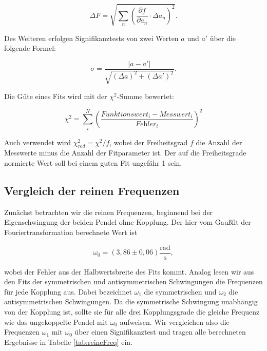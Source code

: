 \documentclass{article}
\begin{document}
\begin{equation}
    \Delta F = \sqrt{\sum_n \left( \frac{\partial f}{\partial a_n} \cdot \Delta a_n \right)^2}.
\end{equation}

Des Weiteren erfolgen Signifikanztests von zwei Werten $a$ und $a'$ über die folgende Formel:

\begin{equation}
    \sigma = \frac{|a-a'|}{\sqrt{(\Delta a)^2 + (\Delta a')^2}}.
\end{equation}

Die Güte eines Fits wird mit der $\chi^2$-Summe bewertet:

\begin{equation}
    \chi^2 = \sum_i^N \left( \frac{\textit{Funktionswert}_i - \textit{Messwert}_i}{\textit{Fehler}_i} \right)^2
\end{equation}

Auch verwendet wird $\chi^2_{red} = \chi^2 / f$, wobei der Freiheitsgrad $f$ die Anzahl der Messwerte minus die Anzahl der Fitparameter ist. Der auf die Freiheitsgrade normierte Wert soll bei einem guten Fit ungefähr 1 sein.

\newpage

\subsection{Vergleich der reinen Frequenzen}

Zunächst betrachten wir die reinen Frequenzen, beginnend bei der Eigenschwingung der beiden Pendel ohne Kopplung. Der hier vom Gaußfit der Fouriertransformation berechnete Wert ist

\begin{equation}
    \omega_0 = (3,86 \pm 0,06) \frac{\text{rad}}{\text{s}},
\end{equation}

wobei der Fehler aus der Halbwertsbreite des Fits kommt. Analog lesen wir aus den Fits der symmetrischen und antisymmetrischen Schwingungen die Frequenzen für jede Kopplung aus. Dabei bezeichnet $\omega_1$ die symmetrischen und $\omega_2$ die antisymmetrischen Schwingungen. Da die symmetrische Schwingung unabhängig von der Kopplung ist, sollte sie für alle drei Kopplungsgrade die gleiche Frequenz wie das ungekoppelte Pendel mit $\omega_0$ aufweisen. Wir vergleichen also die Frequenzen $\omega_1$ mit $\omega_0$ über einen Signifikanztest und tragen alle berechneten Ergebnisse in Tabelle \ref{tab:reineFreq} ein.
\end{document}
